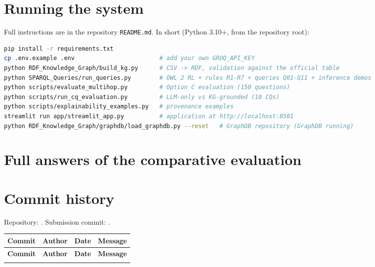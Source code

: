 \section{Running the system}\label{app:run}
Full instructions are in the repository \texttt{README.md}. In short (Python 3.10+, from the repository root):
\begin{lstlisting}[language=bash]
pip install -r requirements.txt
cp .env.example .env                        # add your own GROQ_API_KEY
python RDF_Knowledge_Graph/build_kg.py      # CSV -> RDF, validation against the official table
python SPARQL_Queries/run_queries.py        # OWL 2 RL + rules R1-R7 + queries Q01-Q11 + inference demos
python scripts/evaluate_multihop.py         # Option C evaluation (150 questions)
python scripts/run_cq_evaluation.py         # LLM-only vs KG-grounded (10 CQs)
python scripts/explainability_examples.py   # provenance examples
streamlit run app/streamlit_app.py          # application at http://localhost:8501
python RDF_Knowledge_Graph/graphdb/load_graphdb.py --reset   # GraphDB repository (GraphDB running)
\end{lstlisting}

\section{Full answers of the comparative evaluation}\label{app:answers}


\section{Commit history}\label{app:commits}
Repository: \repoLink. Submission commit: \texttt{\headCommit}.

{\footnotesize
\begin{longtable}{p{1.4cm}p{2.8cm}p{2.0cm}p{8.6cm}}
\toprule \textbf{Commit} & \textbf{Author} & \textbf{Date} & \textbf{Message} \\ \midrule \endfirsthead
\toprule \textbf{Commit} & \textbf{Author} & \textbf{Date} & \textbf{Message} \\ \midrule \endhead
\bottomrule \endfoot

\end{longtable}}
